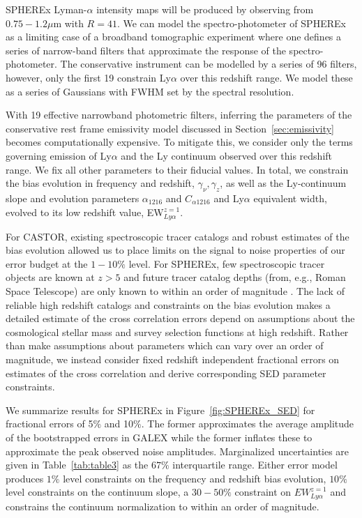 \documentclass[fleqn,usenatbib]{mnras}
\begin{document}
{\small SPHEREx} Lyman-$\alpha$ intensity maps will be produced by observing from $0.75- 1.2 \mu$m with $R = 41$. We can model the spectro-photometer of {\small SPHEREx} as a limiting case of a broadband tomographic experiment where one defines a series of narrow-band filters that approximate the response of the spectro-photometer. The conservative instrument can be modelled by a series of 96 filters, however, only the first 19 constrain Ly$\alpha$ over this redshift range. We model these as a series of Gaussians with FWHM set by the spectral resolution.

With 19 effective narrowband photometric filters, inferring the parameters of the conservative rest frame emissivity model discussed in Section~\ref{sec:emissivity} becomes computationally expensive. To mitigate this, we consider only the terms governing emission of Ly$\alpha$ and the Ly continuum observed over this redshift range. We fix all other parameters to their fiducial values. In total, we constrain the bias evolution in frequency and redshift, $\gamma_{\nu}, \gamma_{z}$, as well as the Ly-continuum slope and evolution parameters $\alpha_{1216}$ and $C_{\alpha 1216}$ and Ly$\alpha$ equivalent width, evolved to its low redshift value, EW$_{Ly\alpha}^{z=1}$. 


For {\small CASTOR}, existing spectroscopic tracer catalogs and robust estimates of the bias evolution allowed us to place limits on the signal to noise properties of our error budget at the $1-10\%$ level. For {\small SPHEREx}, few spectroscopic tracer objects are known at $z>5$ and future tracer catalog depths (from, e.g., Roman Space Telescope) are only known to within an order of magnitude \citep{spergel2015widefield}. The lack of reliable high redshift catalogs and constraints on the bias evolution makes a detailed estimate of the cross correlation errors depend on assumptions about the cosmological stellar mass and survey selection functions at high redshift. Rather than make assumptions about parameters which can vary over an order of magnitude, we instead consider fixed redshift independent fractional errors on estimates of the cross correlation and derive corresponding SED parameter constraints. 



We summarize results for {\small SPHEREx} in Figure~\ref{fig:SPHEREx_SED} for fractional errors of 5$\%$ and 10$\%$. The former approximates the average amplitude of the bootstrapped errors in {\small GALEX} while the former inflates these to approximate the peak observed noise amplitudes. Marginalized uncertainties are given in Table~\ref{tab:table3} as the $67\%$ interquartile range. Either error model produces $1\%$ level constraints on the frequency and redshift bias evolution, $10\%$ level constraints on the continuum slope, a $30-50\%$ constraint on $EW_{Ly\alpha}^{z=1}$ and constrains the continuum normalization to within an order of magnitude. 
\end{document}
